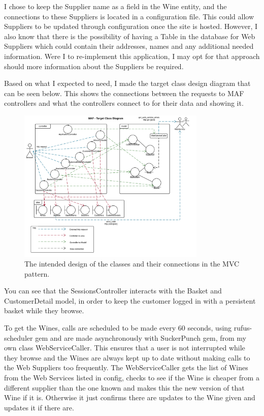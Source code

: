 \documentclass[12pt]{article}
\begin{document}
I chose to keep the Supplier name as a field in the Wine entity, and the connections to these Suppliers is located in a configuration file. This could allow Suppliers to be updated through configuration once the site is hosted. However, I also know that there is the possibility of having a Table in the database for Web Suppliers which could contain their addresses, names and any additional needed information. Were I to re-implement this application, I may opt for that approach should more information about the Suppliers be required.

Based on what I expected to need, I made the target class design diagram that can be seen below. This shows the connections between the requests to MAF controllers and what the controllers connect to for their data and showing it.

\begin{figure}[H]
        \centering
                \includegraphics[width=0.8\textwidth]{assets/MAF_Target_Class_Design}
                \caption{The intended design of the classes and their connections in the MVC pattern.}
                \label{fig: Target Class Diagram.} 
\end{figure}

You can see that the SessionsController interacts with the Basket and CustomerDetail model, in order to keep the customer logged in with a persistent basket while they browse.

To get the Wines, calls are scheduled to be made every 60 seconds, using rufus-scheduler gem\cite{rufus} and are made asynchronously with SuckerPunch gem\cite{suckerpunch}, from my own class WebServiceCaller. This ensures that a user is not interrupted while they browse and the Wines are always kept up to date without making calls to the Web Suppliers too frequently. The WebServiceCaller gets the list of Wines from the Web Services listed in config, checks to see if the Wine is cheaper from a different supplier than the one known and makes this the new version of that Wine if it is. Otherwise it just confirms there are updates to the Wine given and updates it if there are. 
\end{document}
